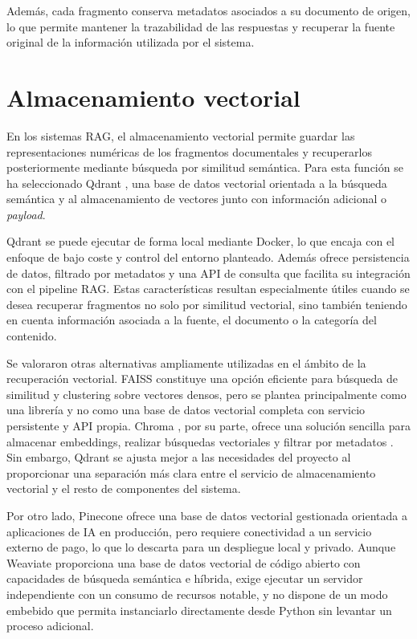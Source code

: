Además, cada fragmento conserva metadatos asociados a su documento de origen, lo que permite mantener la trazabilidad de las respuestas y recuperar la fuente original de la información utilizada por el sistema.

\section{Almacenamiento vectorial}\label{sec:almacenamiento-vectorial}

En los sistemas RAG, el almacenamiento vectorial permite guardar las representaciones numéricas de los fragmentos documentales y recuperarlos posteriormente mediante búsqueda por similitud semántica. 
Para esta función se ha seleccionado Qdrant \cite{qdrantDocs}, una base de datos vectorial orientada a la búsqueda semántica y al almacenamiento de vectores junto con información adicional o \textit{payload}.

Qdrant se puede ejecutar de forma local mediante Docker, lo que encaja con el enfoque de bajo coste y control del entorno planteado. 
Además ofrece persistencia de datos, filtrado por metadatos y una API de consulta que facilita su integración con el pipeline RAG. 
Estas características resultan especialmente útiles cuando se desea recuperar fragmentos no solo por similitud vectorial, sino también teniendo en cuenta información asociada a la fuente, el documento o la categoría del contenido.

Se valoraron otras alternativas ampliamente utilizadas en el ámbito de la recuperación vectorial. 
FAISS \cite{faissDocs} constituye una opción eficiente para búsqueda de similitud y clustering sobre vectores densos, pero se plantea principalmente como una librería y no como una base de datos vectorial completa con servicio persistente y API propia. 
Chroma \cite{chromaDocs} , por su parte, ofrece una solución sencilla para almacenar embeddings, realizar búsquedas vectoriales y filtrar por metadatos . 
Sin embargo, Qdrant se ajusta mejor a las necesidades del proyecto al proporcionar una separación más clara entre el servicio de almacenamiento vectorial y el resto de componentes del sistema.

Por otro lado, Pinecone \cite{pineconeDocs} ofrece una base de datos vectorial gestionada orientada a aplicaciones de IA en producción, pero requiere conectividad a un servicio externo de pago, lo que lo descarta para un despliegue local y privado.
Aunque Weaviate \cite{weaviateDocs} proporciona una base de datos vectorial de código abierto con capacidades de búsqueda semántica e híbrida, exige ejecutar un servidor independiente con un consumo de recursos notable, y no dispone de un modo embebido que permita instanciarlo directamente desde Python sin levantar un proceso adicional. 


